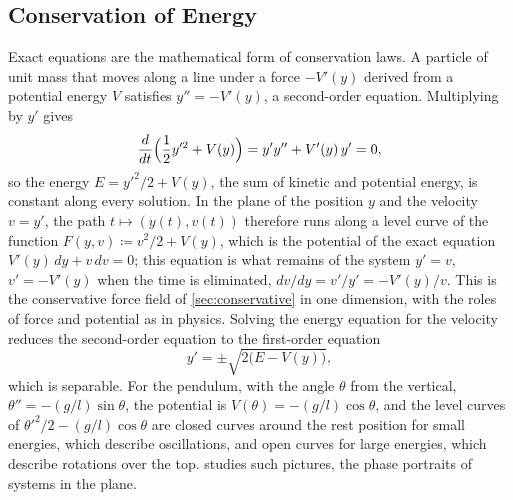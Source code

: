 \begin{figure}
\end{figure}

\subsection{Conservation of Energy}

Exact equations are the mathematical form of conservation laws. A particle of unit mass that moves along a line under a force $-V'(y)$ derived from a potential energy $V$ satisfies $y''=-V'(y)$, a second-order equation. Multiplying by $y'$ gives
\[
\frac d{dt}\Bigl(\frac12y'^2+V(y)\Bigr)=y'y''+V'(y)\,y'=0 ,
\]
so the energy $E=y'^2/2+V(y)$, the sum of kinetic and potential energy, is constant along every solution. In the plane of the position $y$ and the velocity $v=y'$, the path $t\mapsto(y(t),v(t))$ therefore runs along a level curve of the function $F(y,v)\coloneqq v^2/2+V(y)$, which is the potential of the exact equation $V'(y)\,dy+v\,dv=0$; this equation is what remains of the system $y'=v$, $v'=-V'(y)$ when the time is eliminated, $dv/dy=v'/y'=-V'(y)/v$. This is the conservative force field of \cref{sec:conservative} in one dimension, with the roles of force and potential as in physics. Solving the energy equation for the velocity reduces the second-order equation to the first-order equation
\[
y'=\pm\sqrt{2\bigl(E-V(y)\bigr)},
\]
which is separable. For the pendulum, with the angle $\theta$ from the vertical, $\theta''=-(g/l)\sin\theta$, the potential is $V(\theta)=-(g/l)\cos\theta$, and the level curves of $\theta'^2/2-(g/l)\cos\theta$ are closed curves around the rest position for small energies, which describe oscillations, and open curves for large energies, which describe rotations over the top.  studies such pictures, the phase portraits of systems in the plane.

